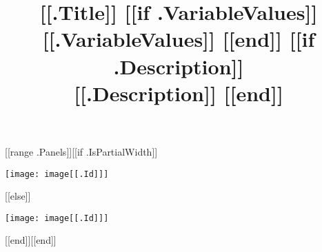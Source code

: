 \documentclass{article}
\begin{document}
\title{[[.Title]] [[if .VariableValues]] \\ \large [[.VariableValues]] [[end]] [[if .Description]] \\ \small [[.Description]] [[end]]}
\maketitle
\begin{center}
[[range .Panels]][[if .IsPartialWidth]]\begin{minipage}{[[.Width]]\textwidth}
\texttt{[image: image[[.Id]]]}
\end{minipage}
[[else]]\par
\vspace{0.5cm}
\texttt{[image: image[[.Id]]]}
\par
\vspace{0.5cm}
[[end]][[end]]

\end{center}
\end{document}

